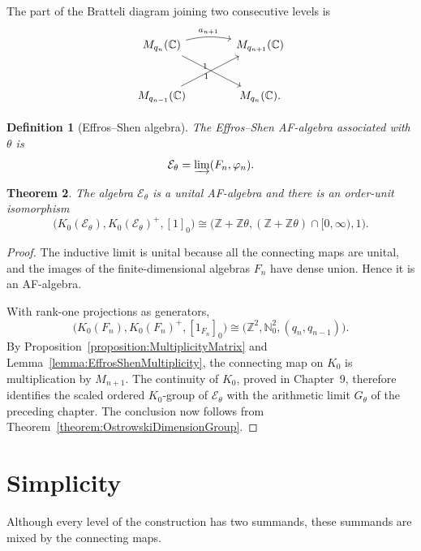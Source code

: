 \documentclass{book}
\newtheorem{definition}{Definition}[section]
\newtheorem{theorem}[definition]{Theorem}
\begin{document}
The part of the Bratteli diagram joining two consecutive levels is
\[
  \begin{tikzcd}[column sep=large,row sep=large]
    M_{q_n}(\mathbb C)
      \arrow[r,bend left=12,"a_{n+1}"]
      \arrow[dr,"1"']
      &M_{q_{n+1}}(\mathbb C)\\
    M_{q_{n-1}}(\mathbb C)
      \arrow[ur,"1"]
      &M_{q_n}(\mathbb C).
  \end{tikzcd}
\]

\begin{definition}[Effros--Shen algebra]\label{definition:EffrosShenAlgebra}
  The \textnormal{Effros--Shen AF-algebra associated with \(\theta\)} is
  \[
    \mathcal E_\theta
      =\varinjlim(F_n,\varphi_n).
  \]
\end{definition}

\begin{theorem}\label{theorem:EffrosShenK0}
  The algebra \(\mathcal E_\theta\) is a unital AF-algebra and there is an
  order-unit isomorphism
  \[
    \bigl(K_0(\mathcal E_\theta),K_0(\mathcal E_\theta)^+,[1]_0\bigr)
    \cong
    \bigl(\mathbb Z+\mathbb Z\theta,
           (\mathbb Z+\mathbb Z\theta)\cap[0,\infty),1\bigr).
  \]
\end{theorem}

\begin{proof}
  The inductive limit is unital because all the connecting maps are unital,
  and the images of the finite-dimensional algebras \(F_n\) have dense
  union.  Hence it is an AF-algebra.

  With rank-one projections as generators,
  \[
    \bigl(K_0(F_n),K_0(F_n)^+,[1_{F_n}]_0\bigr)
      \cong
    \bigl(\mathbb Z^2,\mathbb N_0^2,(q_n,q_{n-1})\bigr).
  \]
  By Proposition~\ref{proposition:MultiplicityMatrix} and
  Lemma~\ref{lemma:EffrosShenMultiplicity}, the connecting map on \(K_0\)
  is multiplication by \(M_{n+1}\).  The continuity of \(K_0\), proved in
  Chapter~9, therefore identifies the scaled ordered \(K_0\)-group of
  \(\mathcal E_\theta\) with the arithmetic limit \(G_\theta\) of the
  preceding chapter.  The conclusion now follows from
  Theorem~\ref{theorem:OstrowskiDimensionGroup}.
\end{proof}

\section{Simplicity}

Although every level of the construction has two summands, these summands
are mixed by the connecting maps.
\end{document}
